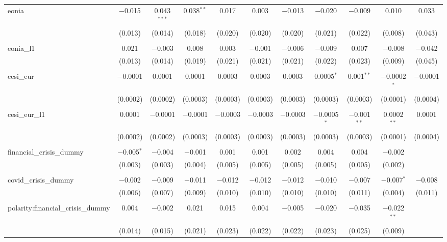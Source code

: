 \begin{table}[!htbp]
\begin{adjustbox}{width=1.25\textwidth}
\begin{tabular}{@{\extracolsep{5pt}}lcccccccccc}
 eonia & $-$0.015 & 0.043$^{***}$ & 0.038$^{**}$ & 0.017 & 0.003 & $-$0.013 & $-$0.020 & $-$0.009 & 0.010 & 0.033 \\ 
  & (0.013) & (0.014) & (0.018) & (0.020) & (0.020) & (0.020) & (0.021) & (0.022) & (0.008) & (0.043) \\ 
  & & & & & & & & & & \\ 
 eonia\_l1 & 0.021 & $-$0.003 & 0.008 & 0.003 & $-$0.001 & $-$0.006 & $-$0.009 & 0.007 & $-$0.008 & $-$0.042 \\ 
  & (0.013) & (0.014) & (0.019) & (0.021) & (0.021) & (0.021) & (0.022) & (0.023) & (0.009) & (0.045) \\ 
  & & & & & & & & & & \\ 
 cesi\_eur & $-$0.0001 & 0.0001 & 0.0001 & 0.0003 & 0.0003 & 0.0003 & 0.0005$^{*}$ & 0.001$^{**}$ & $-$0.0002$^{*}$ & $-$0.0001 \\ 
  & (0.0002) & (0.0002) & (0.0003) & (0.0003) & (0.0003) & (0.0003) & (0.0003) & (0.0003) & (0.0001) & (0.0004) \\ 
  & & & & & & & & & & \\ 
 cesi\_eur\_l1 & 0.0001 & $-$0.0001 & $-$0.0001 & $-$0.0003 & $-$0.0003 & $-$0.0003 & $-$0.0005$^{*}$ & $-$0.001$^{**}$ & 0.0002$^{**}$ & 0.0001 \\ 
  & (0.0002) & (0.0002) & (0.0003) & (0.0003) & (0.0003) & (0.0003) & (0.0003) & (0.0003) & (0.0001) & (0.0004) \\ 
  & & & & & & & & & & \\ 
 financial\_crisis\_dummy & $-$0.005$^{*}$ & $-$0.004 & $-$0.001 & 0.001 & 0.001 & 0.002 & 0.004 & 0.004 & $-$0.002 &  \\ 
  & (0.003) & (0.003) & (0.004) & (0.005) & (0.005) & (0.005) & (0.005) & (0.005) & (0.002) &  \\ 
  & & & & & & & & & & \\ 
 covid\_crisis\_dummy & $-$0.002 & $-$0.009 & $-$0.011 & $-$0.012 & $-$0.012 & $-$0.012 & $-$0.010 & $-$0.007 & $-$0.007$^{*}$ & $-$0.008 \\ 
  & (0.006) & (0.007) & (0.009) & (0.010) & (0.010) & (0.010) & (0.010) & (0.011) & (0.004) & (0.011) \\ 
  & & & & & & & & & & \\ 
 polarity:financial\_crisis\_dummy & 0.004 & $-$0.002 & 0.021 & 0.015 & 0.004 & $-$0.005 & $-$0.020 & $-$0.035 & $-$0.022$^{**}$ &  \\ 
  & (0.014) & (0.015) & (0.021) & (0.023) & (0.022) & (0.022) & (0.023) & (0.025) & (0.009) &  \\ 

\end{tabular}
\end{adjustbox}
\end{table}
